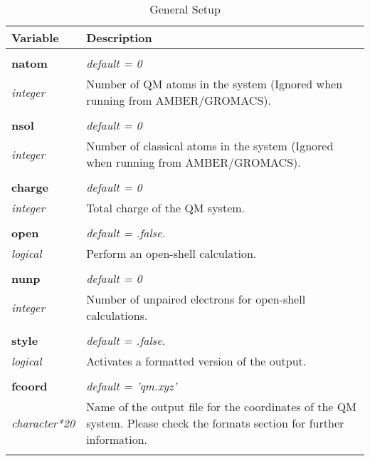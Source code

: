 \begin{Spacing}{1.0}
\begin{longtable}{ p{} p{} }

   \toprule
   \textbf{Variable} & Description \\*
   \midrule \\*
   \endhead

   \bottomrule
   \caption{General Setup}
   \endfoot

   \textbf{natom}
   &  \textit{default = 0 }
   \\*\textit{integer}
   & Number of QM atoms in the system (Ignored when
   running from AMBER/GROMACS).\\* \\

   \textbf{nsol}
   &  \textit{default = 0 }
   \\*\textit{integer}
   & Number of classical atoms in the system (Ignored
   when running from AMBER/GROMACS).\\* \\

   \textbf{charge}
   &  \textit{default = 0 }
   \\*\textit{integer}
   & Total charge of the QM system.\\* \\

   \textbf{open}
   &  \textit{default = .false. }
   \\*\textit{logical}
   & Perform an open-shell calculation.\\* \\

   \textbf{nunp}
   &  \textit{default = 0 }
   \\*\textit{integer}
   & Number of unpaired electrons for open-shell
   calculations.\\* \\

   \textbf{style}
   &  \textit{default = .false. }
   \\*\textit{logical}
   & Activates a formatted version of the output.\\* \\

   \textbf{fcoord}
   &  \textit{default = 'qm.xyz' }
   \\*\textit{character*20}
   & Name of the output file for the coordinates of the
   QM system. Please check the formats section for further
   information.\\* \\


\end{longtable}
\end{Spacing}
